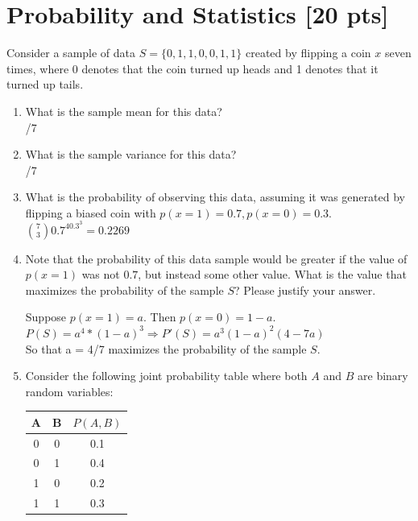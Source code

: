\documentclass[a4paper]{article}
\theoremstyle{definition}
\newenvironment{soln}{
    \leavevmode\color{blue}\ignorespaces
}{}
\begin{document}
\section{Probability and Statistics [20 pts]}
Consider a sample of data $S = \{0, 1, 1, 0, 0, 1, 1\}$ created by flipping a coin $x$ seven times, where 0 denotes that the coin turned up heads and 1 denotes that it turned up tails.
\begin{enumerate}
	\item 	What is the sample mean for this data?\\
	    \begin{soln}  4/7 \end{soln}
	\item 	What is the sample variance for this data?\\
	    \begin{soln}  2/7 \end{soln}
	\item 	What is the probability of observing this data, assuming it was generated by flipping a biased coin with $p(x=1) = 0.7, p(x=0) = 0.3$.\\
	    \begin{soln}  $\binom{7}{3}0.7^40.3^3 = 0.2269$ \end{soln}
	\item 	Note that the probability of this data sample would be greater if the value of $p(x = 1)$ was not $0.7$, but instead some other value. What is the value that maximizes the probability of the sample $S$? Please justify your answer.\\
	    \begin{soln}  
	    	Suppose $p(x = 1) = a$. Then $p(x = 0) = 1-a $.\\
		$P(S)= a^4*(1-a)^3\Longrightarrow P'(S) = a^3(1-a)^2(4-7a)$\\
		So that a = 4/7 maximizes the probability of the sample $S$.
		\end{soln}
	\item 	Consider the following joint probability table where both $A$ and $B$ are binary random variables: 
\begin{table}[htb]
\centering
	\begin{tabular}{ccc}\hline
	A & B & $P(A, B)$  \\\hline
	0 & 0 & 0.1 \\
	0 & 1 & 0.4 \\
	1 & 0 & 0.2 \\
	1 & 1 & 0.3 \\\hline
	\end{tabular}

\end{table}
\end{enumerate}
\end{document}

